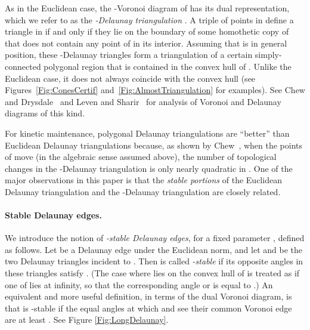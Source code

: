 \documentclass[letter,11pt]{article}
\begin{document}
As in the Euclidean case, the -Voronoi diagram of  has its 
dual representation, which we refer to as the {\em -Delaunay
triangulation} . A triple of points in  define a
triangle in  if and only if they lie on the boundary of some 
homothetic copy of  that does not contain any point of  in its
interior. Assuming that  is in general position, these -Delaunay
triangles form a triangulation of a certain simply-connected polygonal 
region that is contained in the convex hull of .
Unlike the Euclidean case, it does not always coincide with the convex hull (see Figures~\ref{Fig:ConesCertif} and~\ref{Fig:AlmostTriangulation} for examples).
See Chew and Drysdale~\cite{CD} and Leven and Sharir~\cite{LS} for analysis of Voronoi and Delaunay diagrams of this kind.

For kinetic maintenance, polygonal Delaunay triangulations are
``better'' than Euclidean Delaunay triangulations because, as shown by
Chew~\cite{Chew}, when the points of  move (in the algebraic
sense assumed above), the number of topological changes in the 
-Delaunay triangulation is only nearly quadratic in .
One of
the major observations in this paper is that the \textit{stable portions} of the Euclidean Delaunay triangulation and the -Delaunay triangulation are closely related.

\paragraph{Stable Delaunay edges.} 
We introduce the notion of \textit{-stable Delaunay edges}, 
for a fixed parameter , defined as follows.  Let  be 
a Delaunay edge under the Euclidean norm, and let  and  
be the two Delaunay triangles incident to .  Then  is 
called {\em -stable} if its opposite angles in these triangles
satisfy . (The case where
 lies on the convex hull of  is treated as if one of  
lies at infinity, so that the corresponding angle  or 
 is equal to .) An equivalent and more useful definition, in terms of the dual Voronoi diagram, is that 
 is -stable if the equal angles at which  and  
see their common Voronoi edge  are at least .
See Figure \ref{Fig:LongDelaunay}.
\end{document}
